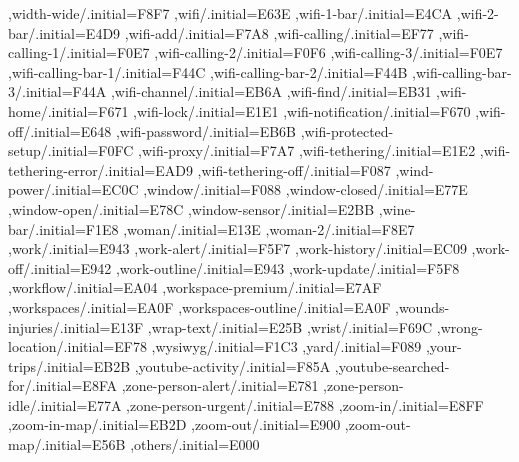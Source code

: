 { ,width-wide/.initial=F8F7
 ,wifi/.initial=E63E
 ,wifi-1-bar/.initial=E4CA
 ,wifi-2-bar/.initial=E4D9
 ,wifi-add/.initial=F7A8
 ,wifi-calling/.initial=EF77
 ,wifi-calling-1/.initial=F0E7
 ,wifi-calling-2/.initial=F0F6
 ,wifi-calling-3/.initial=F0E7
 ,wifi-calling-bar-1/.initial=F44C
 ,wifi-calling-bar-2/.initial=F44B
 ,wifi-calling-bar-3/.initial=F44A
 ,wifi-channel/.initial=EB6A
 ,wifi-find/.initial=EB31
 ,wifi-home/.initial=F671
 ,wifi-lock/.initial=E1E1
 ,wifi-notification/.initial=F670
 ,wifi-off/.initial=E648
 ,wifi-password/.initial=EB6B
 ,wifi-protected-setup/.initial=F0FC
 ,wifi-proxy/.initial=F7A7
 ,wifi-tethering/.initial=E1E2
 ,wifi-tethering-error/.initial=EAD9
 ,wifi-tethering-off/.initial=F087
 ,wind-power/.initial=EC0C
 ,window/.initial=F088
 ,window-closed/.initial=E77E
 ,window-open/.initial=E78C
 ,window-sensor/.initial=E2BB
 ,wine-bar/.initial=F1E8
 ,woman/.initial=E13E
 ,woman-2/.initial=F8E7
 ,work/.initial=E943
 ,work-alert/.initial=F5F7
 ,work-history/.initial=EC09
 ,work-off/.initial=E942
 ,work-outline/.initial=E943
 ,work-update/.initial=F5F8
 ,workflow/.initial=EA04
 ,workspace-premium/.initial=E7AF
 ,workspaces/.initial=EA0F
 ,workspaces-outline/.initial=EA0F
 ,wounds-injuries/.initial=E13F
 ,wrap-text/.initial=E25B
 ,wrist/.initial=F69C
 ,wrong-location/.initial=EF78
 ,wysiwyg/.initial=F1C3
 ,yard/.initial=F089
 ,your-trips/.initial=EB2B
 ,youtube-activity/.initial=F85A
 ,youtube-searched-for/.initial=E8FA
 ,zone-person-alert/.initial=E781
 ,zone-person-idle/.initial=E77A
 ,zone-person-urgent/.initial=E788
 ,zoom-in/.initial=E8FF
 ,zoom-in-map/.initial=EB2D
 ,zoom-out/.initial=E900
 ,zoom-out-map/.initial=E56B
 ,others/.initial=E000

  }
